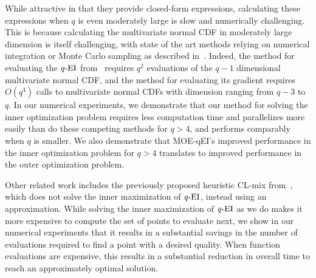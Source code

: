 \documentclass[paper=letter]{scrartcl}
\newcommand{\qEI}{\text{\textit q-EI}}
\begin{document}
While attractive in that they provide closed-form expressions, calculating these expressions when $q$ is even moderately large is slow and numerically challenging.  This is because calculating the multivariate normal CDF in moderately large dimension is itself challenging, with state of the art methods relying on numerical integration or Monte Carlo sampling as described in~\cite{genz1992numerical}. Indeed, the method for evaluating the $\qEI$ from~\cite{chevalier2013fast} requires $q^2$ evaluations of the $q-1$ dimensional multivariate normal CDF, and the method for evaluating its gradient requires $O(q^4)$ calls to multivariate normal CDFs with dimension ranging from $q-3$ to $q$. 
In our numerical experiments, we demonstrate that our method for solving the inner optimization problem requires less computation time and parallelizes more easily than do these competing methods for $q>4$, and performs comparably when $q$ is smaller.
We also demonstrate that MOE-qEI's improved performance in the inner optimization problem for $q>4$ translates to improved performance in the outer optimization problem.

Other related work includes the previously proposed heuristic CL-mix from~\cite{chevalier2013fast}, which does not solve the inner maximization of $\qEI$, instead using an approximation. While solving the inner maximization of $\qEI$ as we do makes it more expensive to compute the set of points to evaluate next, we show in our numerical experiments that it results in a substantial savings in the number of evaluations required to find a point with a desired quality.  When function evaluations are expensive, this results in a substantial reduction in overall time to reach an approximately optimal solution.



\end{document}
